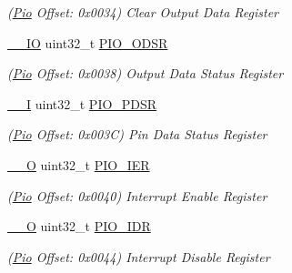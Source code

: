 \begin{DoxyCompactItemize}
\begin{DoxyCompactList}\small\item\em (\mbox{\hyperlink{structPio}{Pio}} Offset\+: 0x0034) Clear Output Data Register \end{DoxyCompactList}\item 
\mbox{\label{structPio_a7d65b86ae7fd35f6764b5fff660ee6e2}} 
\mbox{\hyperlink{core__cm7_8h_aec43007d9998a0a0e01faede4133d6be}{\+\_\+\+\_\+\+IO}} uint32\+\_\+t \mbox{\hyperlink{structPio_a7d65b86ae7fd35f6764b5fff660ee6e2}{P\+I\+O\+\_\+\+O\+D\+SR}}
\begin{DoxyCompactList}\small\item\em (\mbox{\hyperlink{structPio}{Pio}} Offset\+: 0x0038) Output Data Status Register \end{DoxyCompactList}\item 
\mbox{\label{structPio_a33cc522d805124900f831a37fdaf55dd}} 
\mbox{\hyperlink{core__cm7_8h_af63697ed9952cc71e1225efe205f6cd3}{\+\_\+\+\_\+I}} uint32\+\_\+t \mbox{\hyperlink{structPio_a33cc522d805124900f831a37fdaf55dd}{P\+I\+O\+\_\+\+P\+D\+SR}}
\begin{DoxyCompactList}\small\item\em (\mbox{\hyperlink{structPio}{Pio}} Offset\+: 0x003C) Pin Data Status Register \end{DoxyCompactList}\item 
\mbox{\label{structPio_a75182efeb29a07760fc35e05b368a5c3}} 
\mbox{\hyperlink{core__cm7_8h_a7e25d9380f9ef903923964322e71f2f6}{\+\_\+\+\_\+O}} uint32\+\_\+t \mbox{\hyperlink{structPio_a75182efeb29a07760fc35e05b368a5c3}{P\+I\+O\+\_\+\+I\+ER}}
\begin{DoxyCompactList}\small\item\em (\mbox{\hyperlink{structPio}{Pio}} Offset\+: 0x0040) Interrupt Enable Register \end{DoxyCompactList}\item 
\mbox{\label{structPio_afd99aae301a7c82e9872d86793da33bf}} 
\mbox{\hyperlink{core__cm7_8h_a7e25d9380f9ef903923964322e71f2f6}{\+\_\+\+\_\+O}} uint32\+\_\+t \mbox{\hyperlink{structPio_afd99aae301a7c82e9872d86793da33bf}{P\+I\+O\+\_\+\+I\+DR}}
\begin{DoxyCompactList}\small\item\em (\mbox{\hyperlink{structPio}{Pio}} Offset\+: 0x0044) Interrupt Disable Register \end{DoxyCompactList}\item 

\end{DoxyCompactItemize}
